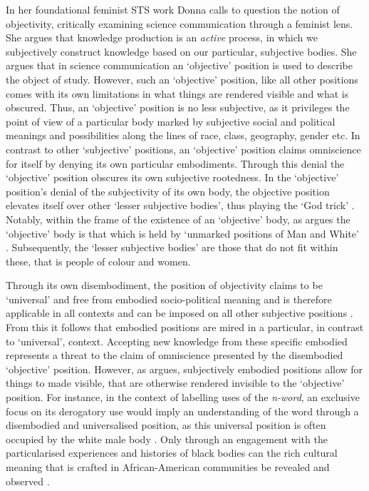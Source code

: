 In her foundational feminist STS work Donna \citet{Haraway:1988} calls to question the notion of objectivity, critically examining science communication through a feminist lens.
She argues that knowledge production is an \textit{active} process, in which we subjectively construct knowledge based on our particular, subjective bodies.
She argues that in science communication an `objective' position is used to describe the object of study.
However, such an `objective' position, like all other positions comes with its own limitations in what things are rendered visible and what is obscured.
Thus, an `objective' position is no less subjective, as it privileges the point of view of a particular body marked by subjective social and political meanings and possibilities along the lines of race, class, geography, gender etc. 
In contrast to other `subjective' positions, an `objective' position claims omniscience for itself by denying its own particular embodiments. 
Through this denial the `objective' position obscures its own subjective rootedness.
In the `objective' position's denial of the subjectivity of its own body, the objective position elevates itself over other `lesser subjective bodies', thus playing the `God trick' \citep{Haraway:1988}.
Notably, within the frame of the existence of an `objective' body, as \citet{Haraway:1988} argues the `objective' body is that which is held by `unmarked positions of Man and White' \cite[p. 8]{Haraway:1988}.
Subsequently, the `lesser subjective bodies' are those that do not fit within these, that is people of colour and women.

Through its own disembodiment, the position of objectivity claims to be `universal' and free from embodied socio-political meaning and is therefore applicable in all contexts and can be imposed on all other subjective positions \citep{Mohanty:1984}.
From this it follows that embodied positions are mired in a particular, in contrast to `universal', context.
Accepting new knowledge from these specific embodied represents a threat to the claim of omniscience presented by the disembodied `objective' position.
However, as \citet{Haraway:1988} argues, subjectively embodied positions allow for things to made visible, that are otherwise rendered invisible to the `objective' position.
For instance, in the context of labelling uses of the \textit{n-word}, an exclusive focus on its derogatory use would imply an understanding of the word through a disembodied and universalised position, as this universal position is often occupied by the white male body \citep{Haraway:1988}.
Only through an engagement with the particularised experiences and histories of black bodies can the rich cultural meaning that is crafted in African-American communities be revealed and observed \citep{Rahman:2012}.


